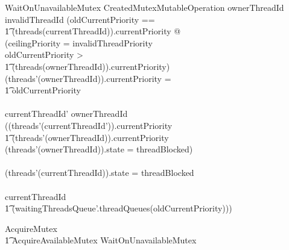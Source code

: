 \documentclass[11pt,letterpaper,twoside,openany]{book}
\begin{document}
\begin{schema}{WaitOnUnavailableMutex}
   CreatedMutexMutableOperation
\where
   ownerThreadId \neq invalidThreadId
\also
(\LET oldCurrentPriority == \\
\t1 (threads(currentThreadId)).currentPriority @ \\
(ceilingPriority = invalidThreadPriority \land \\
 oldCurrentPriority > \\
 \t1 (threads(ownerThreadId)).currentPriority) \implies \\
 (threads'(ownerThreadId)).currentPriority = \\
 \t1 oldCurrentPriority \\
\land \\
 currentThreadId' \neq ownerThreadId \implies \\
 ((threads'(currentThreadId')).currentPriority \geq \\
 \t1 (threads'(ownerThreadId)).currentPriority \lor \\
 (threads'(ownerThreadId)).state = threadBlocked) \\
\land \\
 (threads'(currentThreadId)).state = threadBlocked \\
\land \\
   currentThreadId \in \\
\t1 \ran (waitingThreadsQueue'.threadQueues(oldCurrentPriority)))
\end{schema}

\begin{zed}
   AcquireMutex  \\
   \t1 AcquireAvailableMutex \lor WaitOnUnavailableMutex
\end{zed}
\end{document}
